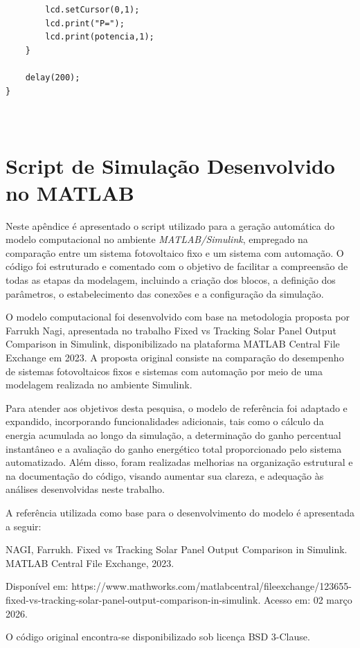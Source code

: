 \begin{apendicesenv}
\begin{verbatim}
        lcd.setCursor(0,1);
        lcd.print("P=");
        lcd.print(potencia,1);
    }

    delay(200);
}



\end{verbatim}

\chapter{Script de Simulação Desenvolvido no MATLAB}

Neste apêndice é apresentado o script utilizado para a geração automática do modelo computacional no ambiente \textit{MATLAB/Simulink}, empregado na comparação entre um sistema fotovoltaico fixo e um sistema com automação. O código foi estruturado e comentado com o objetivo de facilitar a compreensão de todas as etapas da modelagem, incluindo a criação dos blocos, a definição dos parâmetros, o estabelecimento das conexões e a configuração da simulação.

O modelo computacional foi desenvolvido com base na metodologia proposta por Farrukh Nagi, apresentada no trabalho Fixed vs Tracking Solar Panel Output Comparison in Simulink, disponibilizado na plataforma MATLAB Central File Exchange em 2023. A proposta original consiste na comparação do desempenho de sistemas fotovoltaicos fixos e sistemas com automação por meio de uma modelagem realizada no ambiente Simulink.

Para atender aos objetivos desta pesquisa, o modelo de referência foi adaptado e expandido, incorporando funcionalidades adicionais, tais como o cálculo da energia acumulada ao longo da simulação, a determinação do ganho percentual instantâneo e a avaliação do ganho energético total proporcionado pelo sistema automatizado. Além disso, foram realizadas melhorias na organização estrutural e na documentação do código, visando aumentar sua clareza, e adequação às análises desenvolvidas neste trabalho.

A referência utilizada como base para o desenvolvimento do modelo é apresentada a seguir:

NAGI, Farrukh. Fixed vs Tracking Solar Panel Output Comparison in Simulink. MATLAB Central File Exchange, 2023.

Disponível em: https://www.mathworks.com/matlabcentral/fileexchange/123655-fixed-vs-tracking-solar-panel-output-comparison-in-simulink. Acesso em: 02 março 2026.

O código original encontra-se disponibilizado sob licença BSD 3-Clause.





\end{apendicesenv}
